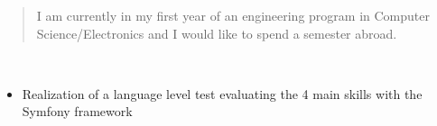 \documentclass[10pt,a4paper,ragged2e,withhyper]{altacv}
\begin{document}
    \begin{paracol}{2}
    
            \begin{quote}
                I am currently in my first year of an engineering program in Computer Science/Electronics and I would like to spend a semester abroad.
            \end{quote}
            
            \bigskip

            \smallskip
            \medskip
            
            \bigskip
        
        \smallskip
            \\
            \divider
        \bigskip
        \smallskip
        
        \smallskip
            \divider
            
            \divider
            
            \divider
            

        \newpage
        \switchcolumn
        
        \vspace{0.1cm}
            \begin{itemize}
                \item Realization of a language level test evaluating the 4 main skills with the Symfony framework
            \end{itemize}
            \divider
            

\end{paracol}
\end{document}
